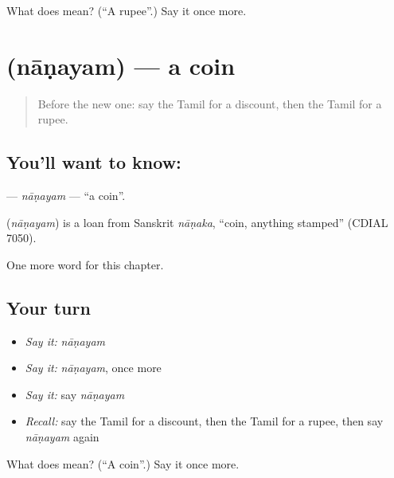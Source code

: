 \begin{tcolorbox}[breakable,colback=teal!4,colframe=teal!35!black,title={Before you move on}]
What does  mean? (\textquotedblleft{}A rupee\textquotedblright{}.) Say it once more.
\end{tcolorbox}
\section[\texorpdfstring{\ta{நாணயம்} (nāṇayam)}{நாணயம் (nāṇayam)}]{ (nāṇayam) — a coin}

\label{lesson:TA-C222-nanayam}



\begin{quote}
Before the new one: say the Tamil for a discount, then the Tamil for a rupee.
\end{quote}

\subsection*{You'll want to know: }
\textbf{} — \emph{nāṇayam} — \textquotedblleft{}a coin\textquotedblright{}.

\begin{cousinweb}
\textbf{} (\emph{nāṇayam}) is a loan from Sanskrit \emph{nāṇaka}, \textquotedblleft{}coin, anything stamped\textquotedblright{} (CDIAL 7050).
\end{cousinweb}

\begin{grammarlens}[title={What you've built}]
One more word for this chapter.
\end{grammarlens}

\subsection*{Your turn}
\begin{itemize}
\raggedright
  \item \emph{Say it:} \emph{nāṇayam}
  \item \emph{Say it:} \emph{nāṇayam}, once more
  \item \emph{Say it:} say \emph{nāṇayam}
  \item \emph{Recall:} say the Tamil for a discount, then the Tamil for a rupee, then say \emph{nāṇayam} again
\end{itemize}

\begin{tcolorbox}[breakable,colback=teal!4,colframe=teal!35!black,title={Before you move on}]
What does  mean? (\textquotedblleft{}A coin\textquotedblright{}.) Say it once more.
\end{tcolorbox}
